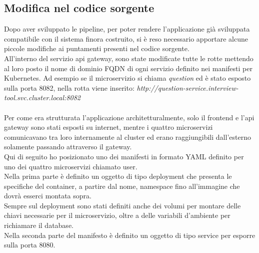 \documentclass[a4paper,12pt]{report}
\begin{document}
\subsection{Modifica nel codice sorgente}
Dopo aver sviluppato le pipeline, per poter rendere l'applicazione già sviluppata compatibile con il sistema finora costruito, si è reso necessario apportare alcune piccole modifiche ai puntamenti presenti nel codice sorgente.\\
All'interno del servizio api gateway, sono state modificate tutte le rotte mettendo al loro posto il nome di dominio FQDN di ogni servizio definito nei manifesti per Kubernetes. Ad esempio se il microservizio si chiama \textit{question} ed è stato esposto sulla porta 8082, nella rotta viene inserito: \textit{http://question-service.interview-tool.svc.cluster.local:8082}\\ \\
Per come era strutturata l'applicazione architetturalmente, solo il frontend e l'api gateway sono stati esposti su internet, mentre i quattro microservizi comunicavano tra loro internamente al cluster ed erano raggiungibili dall'esterno solamente passando attraverso il gateway.\\
Qui di seguito ho posizionato uno dei manifesti in formato YAML definito per uno dei quattro microservizi chiamato user.\\ 
Nella prima parte è definito un oggetto di tipo deployment che presenta le specifiche del container, a partire dal nome, namespace fino all'immagine che dovrà esserci montata sopra.\\ 
Sempre sul deployment sono stati definiti anche dei volumi per montare delle chiavi necessarie per il microservizio, oltre a delle variabili d'ambiente per richiamare il database.\\ 
Nella seconda parte del manifesto è definito un oggetto di tipo service per esporre sulla porta 8080. \\ \\ \\ \\ \\ \\
\end{document}
